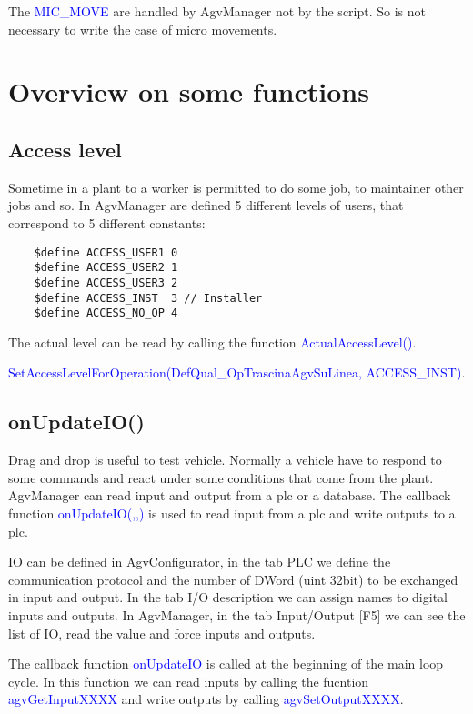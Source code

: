 The \textcolor{blue}{MIC\_MOVE} are handled by AgvManager not by the script. So is not necessary to write the case of micro movements.


%		
\section{Overview on some functions}
\subsection{Access level}
Sometime in a plant to a worker is permitted to do some job, to maintainer other jobs and so. In AgvManager are defined 5 different levels of users, that correspond to 5 different constants:

\begin{lstlisting}
	$define ACCESS_USER1 0
	$define ACCESS_USER2 1
	$define ACCESS_USER3 2
	$define ACCESS_INST  3 // Installer
	$define ACCESS_NO_OP 4
\end{lstlisting}

The actual level can be read by calling the function \textcolor{blue}{ActualAccessLevel()}.

\textcolor{blue}{SetAccessLevelForOperation(DefQual\_OpTrascinaAgvSuLinea, ACCESS\_INST)}.

\subsection{onUpdateIO()}
Drag and drop is useful to test vehicle. Normally a vehicle have to respond to some commands and react under some conditions that come from the plant. AgvManager can read input and output from a plc or a database. The callback function \textcolor{blue}{onUpdateIO(,,)} is used to read input from a plc and write outputs to a plc.

IO can be defined in AgvConfigurator, in the tab PLC we define the communication protocol and the number of DWord (uint 32bit) to be exchanged in input and output. In the tab I/O description we can assign names to digital inputs and outputs.
In AgvManager, in the tab Input/Output [F5] we can see the list of IO, read the value and force inputs and outputs.

The callback function \textcolor{blue}{onUpdateIO} is called at the beginning of the main loop cycle. In this function we can read inputs by calling the fucntion \textcolor{blue}{agvGetInputXXXX} and write outputs by calling \textcolor{blue}{agvSetOutputXXXX}.

